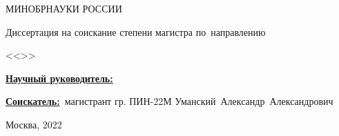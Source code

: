 \begin{frame}
    \begin{center}
        МИНОБРНАУКИ РОССИИ \\
        \thesisOrganization

        \textbf{\large \thesisTitle}

        {%
        Диссертация на соискание степени магистра по~направлению

        }

        {\thesisSpecialtyNumber} <<\thesisSpecialtyTitle>>

    \end{center}

    \underline{\textbf{Научный руководитель:}}~{\supervisorRegaliaShort} \mbox{\supervisorFio}

    \underline{\textbf{Соискатель:}}~магистрант гр. ПИН-22М \mbox{Уманский Александр Александрович}

    \begin{center}
        Москва, 2022
    \end{center}

\end{frame}
